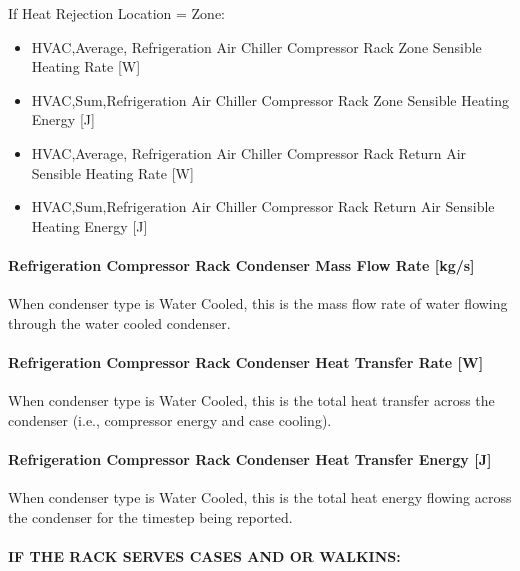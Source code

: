 If Heat Rejection Location = Zone:

\begin{itemize}
\item
  HVAC,Average, Refrigeration Air Chiller Compressor Rack Zone Sensible Heating Rate {[}W{]}
\item
  HVAC,Sum,Refrigeration Air Chiller Compressor Rack Zone Sensible Heating Energy {[}J{]}
\item
  HVAC,Average, Refrigeration Air Chiller Compressor Rack Return Air Sensible Heating Rate {[}W{]}
\item
  HVAC,Sum,Refrigeration Air Chiller Compressor Rack Return Air Sensible Heating Energy {[}J{]}
\end{itemize}

\paragraph{Refrigeration Compressor Rack Condenser Mass Flow Rate {[}kg/s{]}}\label{refrigeration-compressor-rack-condenser-mass-flow-rate-kgs}

When condenser type is Water Cooled, this is the mass flow rate of water flowing through the water cooled condenser.

\paragraph{Refrigeration Compressor Rack Condenser Heat Transfer Rate {[}W{]}}\label{refrigeration-compressor-rack-condenser-heat-transfer-rate-w}

When condenser type is Water Cooled, this is the total heat transfer across the condenser (i.e., compressor energy and case cooling).

\paragraph{Refrigeration Compressor Rack Condenser Heat Transfer Energy {[}J{]}}\label{refrigeration-compressor-rack-condenser-heat-transfer-energy-j}

When condenser type is Water Cooled, this is the total heat energy flowing across the condenser for the timestep being reported.

\paragraph{IF THE RACK SERVES CASES AND OR WALKINS:}\label{if-the-rack-serves-cases-and-or-walkins}

